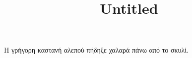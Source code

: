 \documentclass[12pt]{article}
\begin{document}
    \title{Untitled}
    Η γρήγορη καστανή αλεπού πήδηξε χαλαρά πάνω από το σκυλί.
\end{document}
